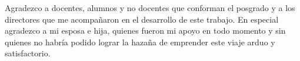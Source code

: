\documentclass[
11pt, %
spanish,
singlespacing, %
parskip, %
headsepline, %
]{MastersDoctoralThesis} %
\begin{document}

\begin{acknowledgements}
\vspace{1.5cm}


Agradezco a docentes, alumnos y no docentes que conforman el posgrado y a los directores que me acompañaron en el desarrollo de este trabajo. En especial agradezco a mi esposa e hija, quienes fueron mi apoyo en todo momento y sin quienes no habría podido lograr la hazaña de emprender este viaje arduo y satisfactorio.

\end{acknowledgements}


\tableofcontents %

\listoffigures %

\listoftables %





\mainmatter %

\pagestyle{thesis} %

\end{document}
